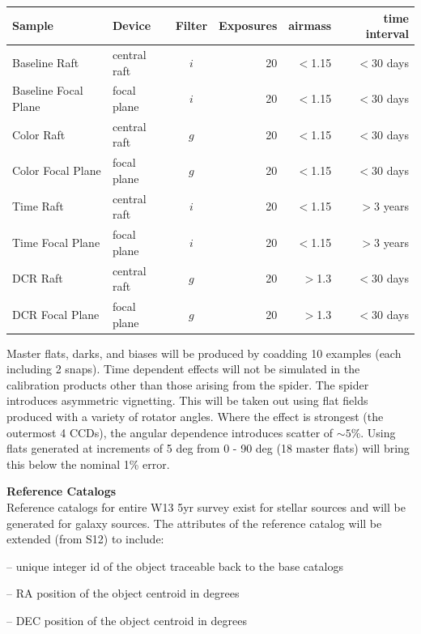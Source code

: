 \documentclass[prd, nofootinbib, floatfix, 11pt,tightenlines,times]{article}
\begin{document}
\begin{table}
\begin{center}
\begin{tabular}{llcrrr}
Sample & Device & Filter & Exposures & airmass & time interval \\
\hline  
Baseline Raft              & central raft  & $i$  & 20 & $<$1.15 &$<$30 days \\
Baseline Focal Plane   & focal plane  &  $i$ & 20 & $<$1.15 &$<$30
days \\
\hline  
Color Raft              & central raft  & $g$  & 20 & $<$1.15 &$<$30 days \\
Color Focal Plane   & focal plane  &  $g$ & 20 & $<$1.15 &$<$30 days \\
\hline 
Time Raft              & central raft  & $i$  & 20 & $<$1.15 &$>$3 years \\
Time Focal Plane   & focal plane  &  $i$ & 20 & $<$1.15 &$>$3 years \\
\hline 
DCR Raft              & central raft  & $g$  & 20 & $>$1.3 &$<$30 days \\
DCR Focal Plane   & focal plane  & $g$  & 20 & $>$1.3 &$<$30 days
\end{tabular}
\end{center}
\end{table}



Master flats, darks, and biases will be produced by coadding 10
examples (each including 2 snaps).  Time dependent effects will not be
simulated in the calibration products other than those arising from
the spider. The spider introduces asymmetric vignetting.  This will be
taken out using flat fields produced with a variety of rotator angles.
Where the effect is strongest (the outermost 4 CCDs), the angular
dependence introduces scatter of $\sim 5$\%.  Using flats generated at
increments of 5 deg from 0 - 90 deg (18 master flats) will bring this
below the nominal 1\% error.


{\bf Reference Catalogs}\\

Reference catalogs for entire W13 5yr survey exist for stellar sources
and will be generated for galaxy sources. The attributes of the
reference catalog will be extended (from S12) to include:

-- unique integer id of the object traceable back to the base catalogs

-- RA position of the object centroid in degrees

-- DEC position of the object centroid in degrees
\end{document}
